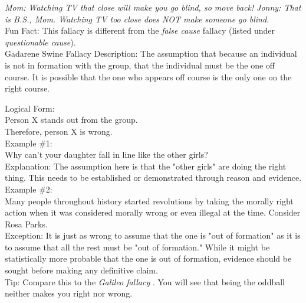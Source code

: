 \documentclass[a4paper,12pt,single,pdftex]{scrartcl}
\begin{document}
    
      {\em Mom: Watching TV that close will make you go blind, so move back!} \newline
{\em Jonny: That is B.S., Mom. Watching TV too close does NOT make someone go blind.}
    \\

    
      Fun Fact: This fallacy is different from the {\em false cause}  fallacy (listed under {\em questionable cause}).
    \\

  

Gadarene Swine Fallacy
    Description: The assumption that because an individual is not in formation with the group, that the individual must be the one off course. It is possible that the one who appears off course is the only one on the right course.

    
      Logical Form:
    \\

    
      Person X stands out from the group.
    \\

    
      Therefore, person X is wrong.
    \\

    
      Example \#1:
    \\

    
      Why can't your daughter fall in line like the other girls?
    \\

    
      Explanation: The assumption here is that the "other girls" are doing the right thing. This needs to be established or demonstrated through reason and evidence.
    \\

    
      Example \#2:
    \\

    
      Many people throughout history started revolutions by taking the morally right action when it was considered morally wrong or even illegal at the time. Consider Rosa Parks.
    \\

    
      Exception: It is just as wrong to assume that the one is "out of formation" as it is to assume that all the rest must be "out of formation." While it might be statistically more probable that the one is out of formation, evidence should be sought before making any definitive claim.
    \\

    
      Tip: Compare this to the {\it Galileo fallacy} . You will see that being the oddball neither makes you right nor wrong.
    \\
\end{document}
